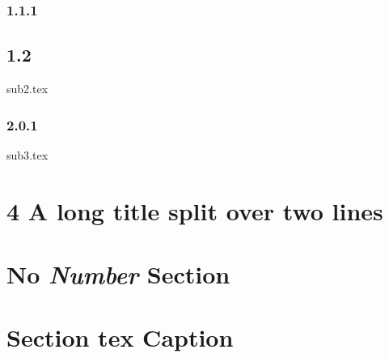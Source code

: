 \documentclass{article}
\begin{document}


\subsubsection{1.1.1}

\subsection{1.2}

{sub2.tex}

\subsubsection{2.0.1}

{sub3.tex}

\section{4 A long title split
over two lines}

\section*{No \textit{Number} Section}

\section{Section \texorpdfstring{tex}{pdf} Caption}
\end{document}
